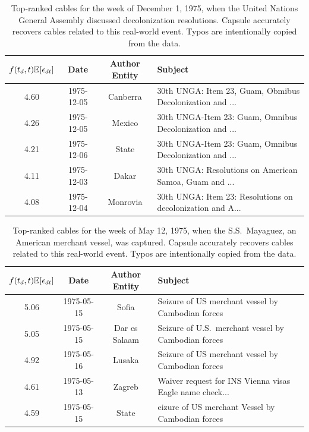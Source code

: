 \begin{table}[tb]
\small
\centering
\begin{tabular}{cccl}
\toprule
$f(t_d, t) \mathbb{E}[\epsilon_{dt}]$ & \textbf{Date} & \textbf{Author Entity} & \textbf{Subject} \\
\midrule
4.60 & 1975-12-05 & Canberra & 30th UNGA: Item 23, Guam, Obmibus Decolonization and ... \\
4.26 & 1975-12-05 & Mexico & 30th UNGA-Item 23: Guam, Omnibus Decolonization and ... \\
4.21 & 1975-12-06 & State & 30th UNGA-Item 23: Guam, Omnibus Decolonization and ... \\
4.11 & 1975-12-03 & Dakar & 30th UNGA: Resolutions on American Samoa, Guam and ...\\
4.08 & 1975-12-04 & Monrovia & 30th UNGA: Item 23: Resolutions on decolonization and A...\\
\bottomrule
\end{tabular}
\caption{Top-ranked cables for the week of December 1, 1975, when the
  United Nations General Assembly discussed decolonization
  resolutions. Capsule accurately recovers cables related to this
  real-world event. Typos are intentionally copied from the data.}
\label{tab:decol}
\end{table}

\begin{table}[tb]
\small
\centering
\begin{tabular}{cccl}
\toprule
$f(t_d, t) \mathbb{E}[\epsilon_{dt}]$ & \textbf{Date} & \textbf{Author Entity} & \textbf{Subject} \\
\midrule
5.06 & 1975-05-15 & Sofia & Seizure of US merchant vessel by Cambodian forces \\
5.05 & 1975-05-15 & Dar es Salaam & Seizure of U.S.~merchant vessel by Cambodian forces \\
4.92 & 1975-05-16 & Lusaka & Seizure of US merchant vessel by Cambodian forces \\
4.61 & 1975-05-13 & Zagreb & Waiver request for INS Vienna visas Eagle name check... \\
4.59 & 1975-05-15 & State & eizure of US merchant Vessel by Cambodian forces \\
\bottomrule
\end{tabular}
\caption{Top-ranked cables for the week of May 12, 1975, when the
  S.S.~Mayaguez, an American merchant vessel, was captured. Capsule
  accurately recovers cables related to this real-world event. Typos
  are intentionally copied from the data.}
\label{tab:mayaguez}
\end{table}

